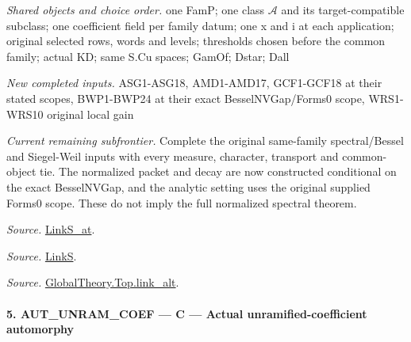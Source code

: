 \documentclass[11pt,a4paper]{article}
\numberwithin{equation}{section}
\theoremstyle{remark}\newtheorem{remark}[theorem]{Remark}
\begin{document}
\emph{Shared objects and choice order.} one FamP; one class $\mathcal A$ and its target-compatible subclass; one coefficient field per family datum; one x and i at each application; original selected rows, words and levels; thresholds chosen before the common family; actual KD; same S.Cu spaces; GamOf; Dstar; Dall

\emph{New completed inputs.} ASG1-ASG18, AMD1-AMD17, GCF1-GCF18 at their stated scopes, BWP1-BWP24 at their exact BesselNVGap/Forms0 scope, WRS1-WRS10 original local gain

\emph{Current remaining subfrontier.} Complete the original same-family spectral/Bessel and Siegel-Weil inputs with every measure, character, transport and common-object tie. The normalized packet and decay are now constructed conditional on the exact BesselNVGap, and the analytic setting uses the original supplied Forms0 scope. These do not imply the full normalized spectral theorem.

\emph{Source.} \href{https://github.com/CocoSgt/riemann-hypothesis-lean/blob/7cbf7a0c32fca1badf05931879a37c3f8a2b03b4/src/Formalism/SharpRestriction/GlobalTheoremInputs.lean#L145-L149}{LinkS\_\allowbreak at}.

\emph{Source.} \href{https://github.com/CocoSgt/riemann-hypothesis-lean/blob/7cbf7a0c32fca1badf05931879a37c3f8a2b03b4/src/Formalism/SharpRestriction/GlobalTheoremInputs.lean#L152-L157}{LinkS}.

\emph{Source.} \href{https://github.com/CocoSgt/riemann-hypothesis-lean/blob/7cbf7a0c32fca1badf05931879a37c3f8a2b03b4/src/Development/AbelianVarietyTheory/Proofs/GlobalInterpolation/LinkAlt.lean#L16-L50}{GlobalTheory.Top.link\_\allowbreak alt}.



\paragraph{5. AUT\_\allowbreak UNRAM\_\allowbreak COEF — C — Actual unramified-coefficient automorphy}
\end{document}
